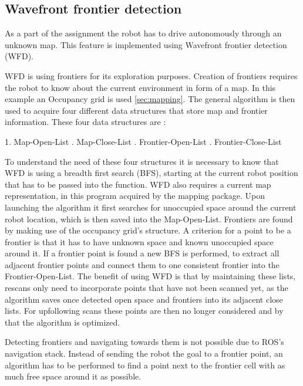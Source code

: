 \documentclass{ba-kecs}
\begin{document}
\subsection{Wavefront frontier detection}

As a part of the assignment the robot has to drive autonomously through an unknown map. This feature is implemented using Wavefront frontier detection (WFD).

WFD is using frontiers for its exploration purposes. Creation of frontiers requires the robot to know about the current environment in form of a map. In this example an Occupancy grid is used \ref{sec:mapping}. The general algorithm is then used to acquire four different data structures that store map and frontier information. These four data structures are :

1. Map-Open-List
. Map-Close-List
. Frontier-Open-List
. Frontier-Close-List 
\newline
 
To understand the need of these four structures it is necessary to know that WFD is using a breadth first search (BFS), starting at the current robot position that has to be passed into the function. WFD also requires a current map representation, in this program acquired by the mapping package.
 Upon launching the algorithm it first searches for unoccupied space around the current robot location, which is then saved into the Map-Open-List. 
 Frontiers are found by making use of the occupancy grid's structure. A criterion for a point to be a frontier is that it has to have unknown space and known unoccupied space around it. If a frontier point is found a new BFS is performed, to extract all adjacent frontier points and connect them to one consistent frontier into the Frontier-Open-List.
 The benefit of using WFD is that by maintaining these lists, rescans only need to incorporate points that have not been scanned yet, as the algorithm saves once detected open space and frontiers into its adjacent close lists. For upfollowing scans these points are then no longer considered and by that the algorithm is optimized.
 
 Detecting frontiers and navigating towards them is not possible due to ROS's navigation stack. Instead of sending the robot the goal to a frontier point, an algorithm has to be performed to find a point next to the frontier cell with as much free space around it as possible. 
\end{document}
